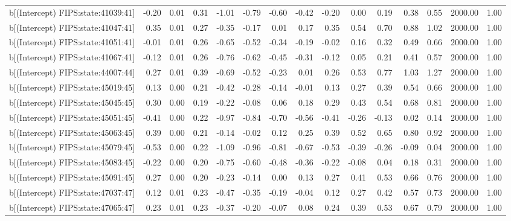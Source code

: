 \begin{table}[ht]
\begin{tabular}{rrrrrrrrrrrrrrr}
  b[(Intercept) FIPS:state:41039:41] & -0.20 & 0.01 & 0.31 & -1.01 & -0.79 & -0.60 & -0.42 & -0.20 & 0.00 & 0.19 & 0.38 & 0.55 & 2000.00 & 1.00 \\ 
  b[(Intercept) FIPS:state:41047:41] & 0.35 & 0.01 & 0.27 & -0.35 & -0.17 & 0.01 & 0.17 & 0.35 & 0.54 & 0.70 & 0.88 & 1.02 & 2000.00 & 1.00 \\ 
  b[(Intercept) FIPS:state:41051:41] & -0.01 & 0.01 & 0.26 & -0.65 & -0.52 & -0.34 & -0.19 & -0.02 & 0.16 & 0.32 & 0.49 & 0.66 & 2000.00 & 1.00 \\ 
  b[(Intercept) FIPS:state:41067:41] & -0.12 & 0.01 & 0.26 & -0.76 & -0.62 & -0.45 & -0.31 & -0.12 & 0.05 & 0.21 & 0.41 & 0.57 & 2000.00 & 1.00 \\ 
  b[(Intercept) FIPS:state:44007:44] & 0.27 & 0.01 & 0.39 & -0.69 & -0.52 & -0.23 & 0.01 & 0.26 & 0.53 & 0.77 & 1.03 & 1.27 & 2000.00 & 1.00 \\ 
  b[(Intercept) FIPS:state:45019:45] & 0.13 & 0.00 & 0.21 & -0.42 & -0.28 & -0.14 & -0.01 & 0.13 & 0.27 & 0.39 & 0.54 & 0.66 & 2000.00 & 1.00 \\ 
  b[(Intercept) FIPS:state:45045:45] & 0.30 & 0.00 & 0.19 & -0.22 & -0.08 & 0.06 & 0.18 & 0.29 & 0.43 & 0.54 & 0.68 & 0.81 & 2000.00 & 1.00 \\ 
  b[(Intercept) FIPS:state:45051:45] & -0.41 & 0.00 & 0.22 & -0.97 & -0.84 & -0.70 & -0.56 & -0.41 & -0.26 & -0.13 & 0.02 & 0.14 & 2000.00 & 1.00 \\ 
  b[(Intercept) FIPS:state:45063:45] & 0.39 & 0.00 & 0.21 & -0.14 & -0.02 & 0.12 & 0.25 & 0.39 & 0.52 & 0.65 & 0.80 & 0.92 & 2000.00 & 1.00 \\ 
  b[(Intercept) FIPS:state:45079:45] & -0.53 & 0.00 & 0.22 & -1.09 & -0.96 & -0.81 & -0.67 & -0.53 & -0.39 & -0.26 & -0.09 & 0.04 & 2000.00 & 1.00 \\ 
  b[(Intercept) FIPS:state:45083:45] & -0.22 & 0.00 & 0.20 & -0.75 & -0.60 & -0.48 & -0.36 & -0.22 & -0.08 & 0.04 & 0.18 & 0.31 & 2000.00 & 1.00 \\ 
  b[(Intercept) FIPS:state:45091:45] & 0.27 & 0.00 & 0.20 & -0.23 & -0.14 & 0.00 & 0.13 & 0.27 & 0.41 & 0.53 & 0.66 & 0.76 & 2000.00 & 1.00 \\ 
  b[(Intercept) FIPS:state:47037:47] & 0.12 & 0.01 & 0.23 & -0.47 & -0.35 & -0.19 & -0.04 & 0.12 & 0.27 & 0.42 & 0.57 & 0.73 & 2000.00 & 1.00 \\ 
  b[(Intercept) FIPS:state:47065:47] & 0.23 & 0.01 & 0.23 & -0.37 & -0.20 & -0.07 & 0.08 & 0.24 & 0.39 & 0.53 & 0.67 & 0.79 & 2000.00 & 1.00 \\ 

\end{tabular}
\end{table}
